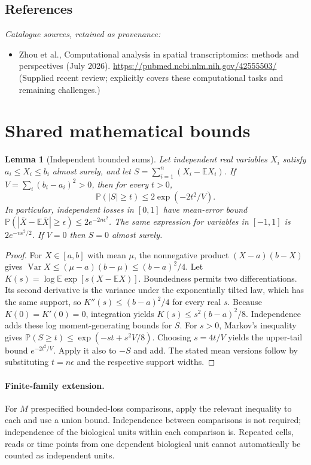 \documentclass[11pt]{article}
\newcommand{\E}{\mathbb E}
\newcommand{\Prob}{\mathbb P}
\DeclareMathOperator{\Var}{Var}
\providecommand{\E}{\mathbb E}
\providecommand{\Prob}{\mathbb P}
\providecommand{\Var}{\operatorname{Var}}
\newtheorem{sharedlemma}{Lemma}[section]
\begin{document}
\subsection{References}
\noindent\emph{Catalogue sources, retained as provenance:}
\begin{itemize}
\item Zhou et al., Computational analysis in spatial transcriptomics: methods and perspectives (July 2026). \url{https://pubmed.ncbi.nlm.nih.gov/42555503/} (Supplied recent review; explicitly covers these computational tasks and remaining challenges.)
\end{itemize}
\clearpage


\appendix
\section{Shared mathematical bounds}\label{app:bounds}
\begin{sharedlemma}[Independent bounded sums]\label{lem:bounded}
Let independent real variables $X_i$ satisfy $a_i\leq X_i\leq b_i$ almost surely,
and let $S=\sum_{i=1}^n(X_i-\E X_i)$. If
$V=\sum_i(b_i-a_i)^2>0$, then for every $t>0$,
\[
 \Prob(|S|\geq t)\leq 2\exp(-2t^2/V).
\]
In particular, independent losses in $[0,1]$ have mean-error bound
$\Prob(|\overline X-\E\overline X|\geq\epsilon)
\leq2e^{-2n\epsilon^2}$. The same expression for variables in $[-1,1]$
is $2e^{-n\epsilon^2/2}$. If $V=0$ then $S=0$ almost surely.
\end{sharedlemma}
\begin{proof}
For $X\in[a,b]$ with mean $\mu$, the nonnegative product
$(X-a)(b-X)$ gives
$\Var X\leq(\mu-a)(b-\mu)\leq(b-a)^2/4$.
Let $K(s)=\log\E\exp[s(X-\E X)]$.
Boundedness permits two differentiations. Its second derivative is the variance
under the exponentially tilted law, which has the same support, so
$K''(s)\leq(b-a)^2/4$ for every real $s$.
Because $K(0)=K'(0)=0$, integration yields
$K(s)\leq s^2(b-a)^2/8$.
Independence adds these log moment-generating bounds for $S$.
For $s>0$, Markov's inequality gives
$\Prob(S\geq t)\leq\exp(-st+s^2V/8)$.
Choosing $s=4t/V$ yields the upper-tail bound $e^{-2t^2/V}$.
Apply it also to $-S$ and add. The stated mean versions follow by substituting
$t=n\epsilon$ and the respective support widths.
\end{proof}

\paragraph{Finite-family extension.}
For $M$ prespecified bounded-loss comparisons, apply the relevant inequality to
each and use a union bound. Independence between comparisons is not required;
independence of the biological units within each comparison is. Repeated cells,
reads or time points from one dependent biological unit cannot automatically be
counted as independent units.
\end{document}
